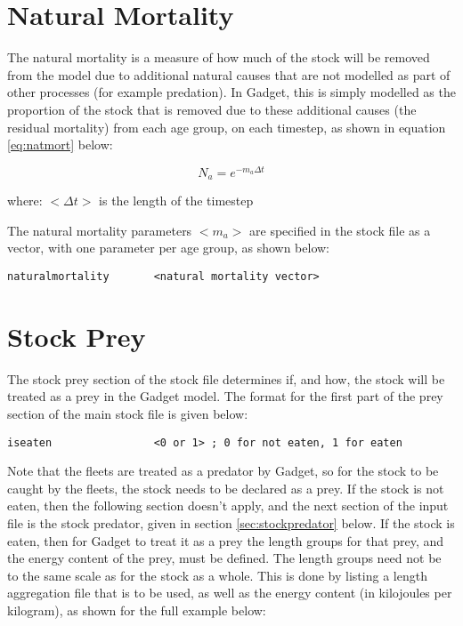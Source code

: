 \documentclass[]{book}
\begin{document}
\hypertarget{sec:stocknatmort}{%
\section{Natural Mortality}\label{sec:stocknatmort}}

The natural mortality is a measure of how much of the stock will be
removed from the model due to additional natural causes that are not
modelled as part of other processes (for example predation). In Gadget,
this is simply modelled as the proportion of the stock that is removed
due to these additional causes (the residual mortality) from each age
group, on each timestep, as shown in
equation \eqref{eq:natmort} below:

\begin{equation}
\label{eq:natmort}
N_{a} = e^{-m_{a} \Delta t}\end{equation}

where: \(<\Delta t>\) is the length of the timestep

The natural mortality parameters \(<m_{a}>\) are specified in the stock
file as a vector, with one parameter per age group, as shown below:

\begin{verbatim}
naturalmortality       <natural mortality vector>
\end{verbatim}

\hypertarget{sec:stockprey}{%
\section{Stock Prey}\label{sec:stockprey}}

The stock prey section of the stock file determines if, and how, the
stock will be treated as a prey in the Gadget model. The format for the
first part of the prey section of the main stock file is given below:

\begin{verbatim}
iseaten                <0 or 1> ; 0 for not eaten, 1 for eaten
\end{verbatim}

Note that the fleets are treated as a predator by Gadget, so for the
stock to be caught by the fleets, the stock needs to be declared as a
prey. If the stock is not eaten, then the following section doesn't
apply, and the next section of the input file is the stock predator,
given in section \ref{sec:stockpredator} below. If the stock is eaten, then for
Gadget to treat it as a prey the length groups for that prey, and the
energy content of the prey, must be defined. The length groups need not
be to the same scale as for the stock as a whole. This is done by
listing a length aggregation file that is to be used, as well as the
energy content (in kilojoules per kilogram), as shown for the full
example below:
\end{document}
